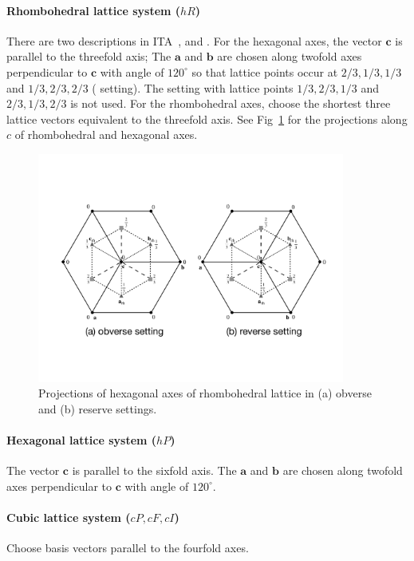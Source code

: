 \paragraph{Rhombohedral lattice system ($hR$)}
There are two descriptions in ITA~\cite{ITA2016},  and .
For the hexagonal axes, the vector $\bm{c}$ is parallel to the threefold axis;
The $\bm{a}$ and $\bm{b}$ are chosen along twofold axes perpendicular to $\bm{c}$ with angle of $120^{\circ}$ so that lattice points occur at $2/3, 1/3, 1/3$ and $1/3, 2/3, 2/3$ ( setting).
The  setting with lattice points $1/3, 2/3, 1/3$ and $2/3, 1/3, 2/3$ is not used.
For the rhombohedral axes, choose the shortest three lattice vectors equivalent to the threefold axis.
See Fig~\ref{fig:hexagonal_axes} for the projections along $c$ of rhombohedral and hexagonal axes.

\begin{figure}[htb]
  \centering
  \includegraphics[width=0.9\textwidth]{figure/fig_hexagonal_axes.pdf}
  \caption{Projections of hexagonal axes of rhombohedral lattice in (a) obverse and (b) reserve settings.}
  \label{fig:hexagonal_axes}
\end{figure}

\paragraph{Hexagonal lattice system ($hP$)}
The vector $\bm{c}$ is parallel to the sixfold axis.
The $\bm{a}$ and $\bm{b}$ are chosen along twofold axes perpendicular to $\bm{c}$ with angle of $120^{\circ}$.

\paragraph{Cubic lattice system ($cP, cF, cI$)}
Choose basis vectors parallel to the fourfold axes.

